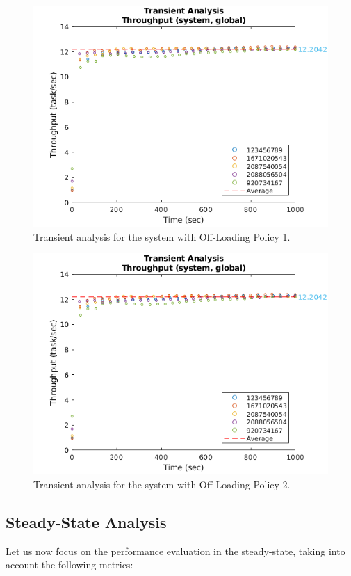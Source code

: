 \begin{figure}
	\includegraphics[width=\columnwidth]{fig/evaluation-transient-analysis-throughput}
	\caption{Transient analysis for the system with Off-Loading Policy 1.}
	\label{fig:evaluation-transient-analysis-throughput-1}
\end{figure}

\begin{figure}
	\includegraphics[width=\columnwidth]{fig/evaluation-transient-analysis-throughput}
	\caption{Transient analysis for the system with Off-Loading Policy 2.}
	\label{fig:evaluation-transient-analysis-throughput-2}
\end{figure}


\subsection{Steady-State Analysis}
Let us now focus on the performance evaluation in the steady-state, taking into account the following metrics:

